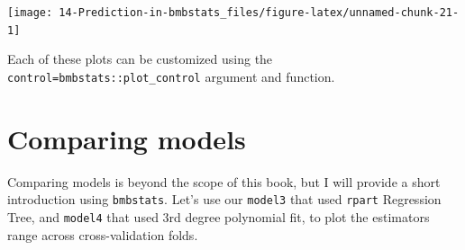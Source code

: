 \documentclass[
]{book}
\begin{document}
\begin{center}\texttt{[image: 14-Prediction-in-bmbstats\_files/figure-latex/unnamed-chunk-21-1]} \end{center}

Each of these plots can be customized using the \texttt{control=bmbstats::plot\_control} argument and function.

\hypertarget{comparing-models}{%
\section{Comparing models}\label{comparing-models}}

Comparing models is beyond the scope of this book, but I will provide a short introduction using \texttt{bmbstats}. Let's use our \texttt{model3} that used \texttt{rpart} Regression Tree, and \texttt{model4} that used 3rd degree polynomial fit, to plot the estimators range across cross-validation folds.
\end{document}
